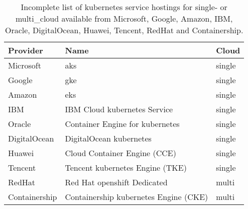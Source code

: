 \documentclass[../main.tex]{subfiles}
\begin{document}
    \begin{table}[h]
        \centering
        \begin{tabular}{ l  l  l }
            \toprule
            \textbf{Provider} & \textbf{Name} & \textbf{Cloud} \\ \midrule
            Microsoft & \acrfull{aks} & single \\ \midrule
            Google & \acrfull{gke} & single \\ \midrule
            Amazon & \acrfull{eks} & single \\ \midrule
            IBM & IBM Cloud \gls{kubernetes} Service & single \\ \midrule
            Oracle & Container Engine for \gls{kubernetes} & single \\ \midrule
            DigitalOcean & DigitalOcean \gls{kubernetes} & single \\ \midrule
            Huawei & Cloud Container Engine (CCE) & single \\ \midrule
            Tencent & Tencent \gls{kubernetes} Engine (TKE) & single \\ \midrule
            RedHat & Red Hat \gls{openshift} Dedicated & multi \\ \midrule
            Containership & Containership \gls{kubernetes} Engine (CKE) & multi \\
            \bottomrule
        \end{tabular}
        \captionsetup{justification=centering}
        \caption{
            Incomplete list of \gls{kubernetes} service hostings for single- or \gls{multi_cloud} available from Microsoft, Google, Amazon, IBM, Oracle, DigitalOcean, Huawei, Tencent, RedHat and Containership.\cite{k8s_offering_aks,k8s_offering_gke,k8s_offering_eks,k8s_offering_ibm,k8s_offering_oracle,k8s_offering_digioc,k8s_offering_huawei,k8s_offering_tencent,k8s_offering_redhat,k8s_offering_cke}
        }
        \label{tab:k8s_offerings}
    \end{table}
\end{document}
